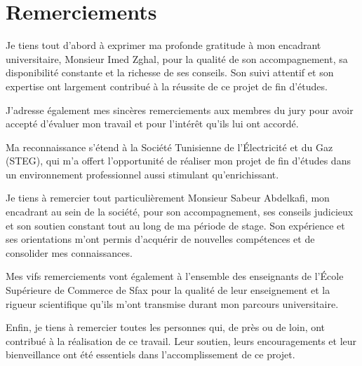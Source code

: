 \chapter*{Remerciements}
\thispagestyle{empty}

\setlength{\parindent}{0pt}
\setlength{\parskip}{0.9em}

Je tiens tout d’abord à exprimer ma profonde gratitude à mon encadrant universitaire, Monsieur Imed Zghal, pour la qualité de son accompagnement, sa disponibilité constante et la richesse de ses conseils. Son suivi attentif et son expertise ont largement contribué à la réussite de ce projet de fin d’études.

J’adresse également mes sincères remerciements aux membres du jury pour avoir accepté d’évaluer mon travail et pour l’intérêt qu’ils lui ont accordé.

Ma reconnaissance s’étend à la Société Tunisienne de l’Électricité et du Gaz (STEG), qui m’a offert l’opportunité de réaliser mon projet de fin d’études dans un environnement professionnel aussi stimulant qu’enrichissant.

Je tiens à remercier tout particulièrement Monsieur Sabeur Abdelkafi, mon encadrant au sein de la société, pour son accompagnement, ses conseils judicieux et son soutien constant tout au long de ma période de stage. Son expérience et ses orientations m’ont permis d’acquérir de nouvelles compétences et de consolider mes connaissances.

Mes vifs remerciements vont également à l’ensemble des enseignants de l’École Supérieure de Commerce de Sfax pour la qualité de leur enseignement et la rigueur scientifique qu’ils m’ont transmise durant mon parcours universitaire.

Enfin, je tiens à remercier toutes les personnes qui, de près ou de loin, ont contribué à la réalisation de ce travail. Leur soutien, leurs encouragements et leur bienveillance ont été essentiels dans l’accomplissement de ce projet.
 

\clearpage